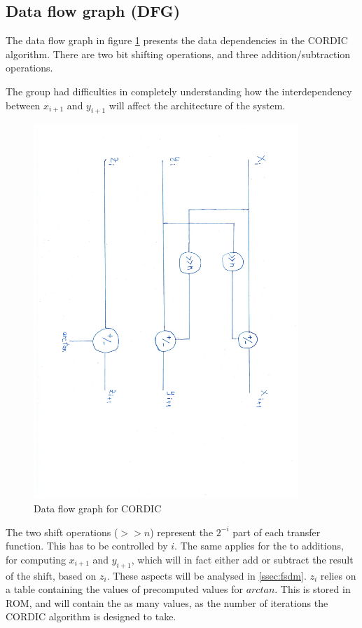\documentclass[12pt, a4paper,oneside]{article}
\begin{document}
\subsection{Data flow graph (DFG)}
The data flow graph in figure \ref{fig:cordic_dfg} presents the data dependencies
in the CORDIC algorithm. There are two bit shifting operations, and three
addition/subtraction operations. 


The group had difficulties 
in completely understanding how the interdependency between $x_{i+1}$
and $y_{i+1}$ will affect the architecture of the system.

\begin{figure}[H]
	\centering
    \includegraphics[clip, trim=2cm 7cm 2.2cm 2.5cm, width = 10cm,angle=90]{cordic_dfg.pdf}
	\caption{Data flow graph for CORDIC}
	\label{fig:cordic_dfg}
\end{figure}

The two shift operations ($>>n$) represent the $2^{-i}$ part of each transfer 
function. This has to be controlled by $i$. The same applies for the to 
additions, for computing $x_{i+1}$ and $y_{i+1}$, which will in fact 
either add or subtract the result of the shift, based on $z_i$. These aspects
will be analysed in \ref{ssec:fsdm}. $z_i$ relies on a table containing the 
values of precomputed values for $arctan$. This is stored in ROM, and will
contain the as many values, as the number of iterations the CORDIC algorithm 
is designed to take.
\end{document}
